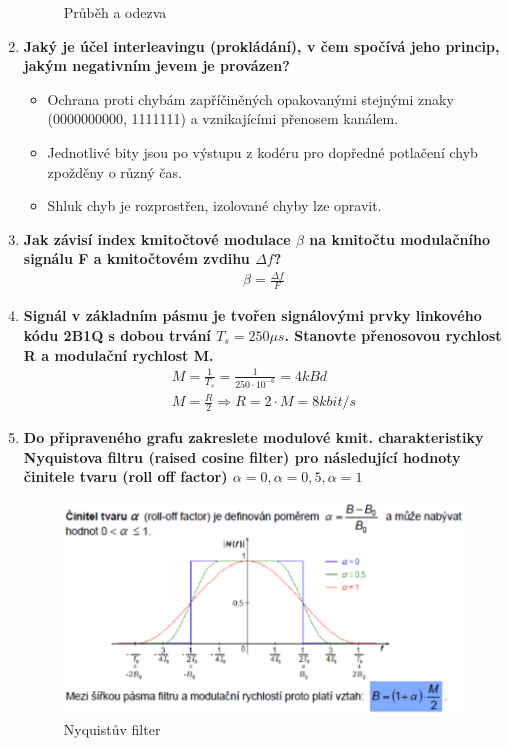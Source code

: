 \begin{enumerate}
\begin{figure}[h]
        \caption{Průběh a odezva}
    \end{figure}
    \item \textbf{Jaký je účel interleavingu (prokládání), v čem spočívá jeho princip, jakým negativním jevem
    je provázen?}
    \begin{itemize}
        \item Ochrana proti chybám zapříčiněných opakovanými stejnými znaky (0000000000, 1111111) a
        vznikajícími přenosem kanálem.
        \item Jednotlivé bity jsou po výstupu z kodéru pro dopředné potlačení chyb zpožděny o různý čas.
        \item Shluk chyb je rozprostřen, izolované chyby lze opravit.
    \end{itemize}
    \item \textbf{Jak závisí index kmitočtové modulace \(\beta\) na kmitočtu modulačního signálu F a
    kmitočtovém zvdihu \(\Delta f\)?}
    \begin{align*}
        \beta = \frac{\Delta f}{F}
    \end{align*}
    \item \textbf{Signál v základním pásmu je tvořen signálovými prvky linkového kódu 2B1Q s dobou
    trvání \(T_s = 250 \mu s\). Stanovte přenosovou rychlost R a modulační rychlost M.}
    \begin{align*}
        M = \frac{1}{T_s} = \frac{1}{250 \cdot 10^{-6}} = 4kBd\\
        M = \frac{R}{2} \Rightarrow R = 2\cdot M = 8kbit/s
    \end{align*}
    \item \textbf{Do připraveného grafu zakreslete modulové kmit. charakteristiky Nyquistova filtru (raised
    cosine filter) pro následující hodnoty činitele tvaru (roll off factor) \(\alpha = 0, \alpha = 0,5, \alpha = 1\)}
    \begin{figure}[h]
        \centering
        \includegraphics[scale = 0.5]{images/NyquistFilter.png}
        \caption{Nyquistův filter}
    \end{figure}
\end{enumerate}


